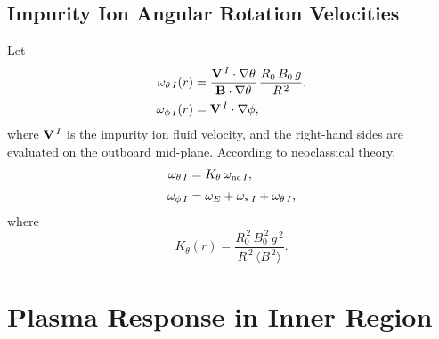\documentclass[notitlepage,12pt]{article}
\begin{document}
\subsection{Impurity Ion Angular Rotation Velocities}\label{srotation}
Let
\begin{align}
\omega_{\theta\,I}(r)&=\frac{{\bf V}^{\,I}\cdot\nabla\theta}{{\bf B}\cdot\nabla\theta}\,\frac{R_0\,B_0\,g}{R^{\,2}},\\[0.5ex]
\omega_{\phi\,I}(r) &= {\bf V}^{\,I}\cdot\nabla\phi,
\end{align}
where ${\bf V}^{\,I}$ is the impurity ion fluid velocity, and the right-hand sides are evaluated on the outboard mid-plane. According to neoclassical theory,
\begin{align}
\omega_{\theta\,I} &= K_\theta\,\omega_{{\rm nc}\,I},\\[0.5ex]
\omega_{\phi\,I} &= \omega_E+\omega_{\ast\,I} + \omega_{\theta\,I},
\end{align}
where
\begin{equation}
K_\theta(r) = \frac{R_0^{\,2}\,B_0^{\,2}\,g^{\,2}}{R^{\,2}\,\langle B^{\,2}\rangle}.
\end{equation}

\section{Plasma Response in Inner Region}
\end{document}
